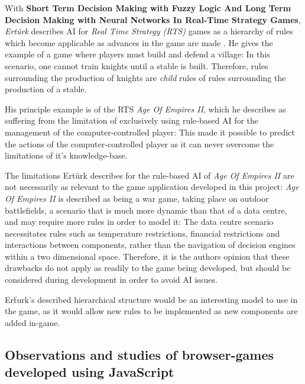 With \textbf{Short Term Decision Making with Fuzzy Logic And Long Term Decision Making with Neural Networks In Real-Time Strategy Games},
\emph{Ert\"urk} describes AI for \emph{Real Time Strategy (RTS)} games as a hierarchy of rules which become applicable as advances in the game are made \cite[Section 3]{RTSAILogic}. He gives the example of a game where players must build and defend a village: In this scenario, one cannot train knights until a stable is built. Therefore, rules surrounding the production of knights are \emph{child} rules of rules surrounding the production of a stable.

His principle example is of the RTS \emph{Age Of Empires II}, which he describes as suffering from the limitation of exclusively using rule-based AI for the management of the computer-controlled player: This made it possible to predict the actions of the computer-controlled player as it can never overcome the limitations of it's knowledge-base.


The limitations Ert\"urk \cite[Section 3]{RTSAILogic} describes for the rule-based AI of \emph{Age Of Empires II} are not necessarily as relevant to the game application developed in this project: \emph{Age Of Empires II} is described as being a war game, taking place on outdoor battlefields, a scenario that is much more dynamic than that of a data centre, and may require more rules in order to model it: The \gls{data centre} scenario necessitates rules such as temperature restrictions, financial restrictions and interactions between components, rather than the navigation of decision engines within a two dimensional space. Therefore, it is the authors opinion that these drawbacks do not apply as readily to the game being developed, but should be considered during development in order to avoid AI issues.

Er\"turk's described hierarchical structure would be an interesting model to use in the game, as it would allow new rules to be implemented as new components are added in-game.

\subsection{Observations and studies of browser-games developed using JavaScript}
\label{sec:ACriticalReviewOfReleventScientificAndEngineeringLiturature:ObservationsAndStudiesOfBrowserGamesDevelopedUsingJavaScript}

